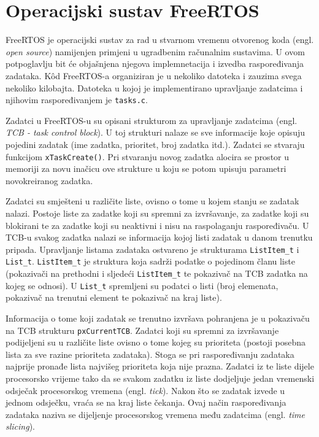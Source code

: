 \documentclass[../zavrsni.tex]{subfiles}
\begin{document}
\sloppy

\justifying

\section{Operacijski sustav FreeRTOS}

FreeRTOS je operacijski sustav za rad u stvarnom vremenu otvorenog koda (engl. \textit{open source}) namijenjen primjeni u ugradbenim 
računalnim sustavima. U ovom potpoglavlju bit će objašnjena 
njegova implemnetacija i izvedba raspoređivanja zadataka. K\^{o}d FreeRTOS-a organiziran je u nekoliko datoteka i zauzima 
svega nekoliko kilobajta. Datoteka u kojoj je implementirano upravljanje zadatcima i njihovim raspoređivanjem je \texttt{tasks.c}.

Zadatci u FreeRTOS-u su opisani strukturom za upravljanje zadatcima (engl. \textit{TCB - task control block}). U toj strukturi nalaze
se sve informacije koje opisuju pojedini zadatak (ime zadatka, prioritet, broj zadatka itd.).  
Zadatci se stvaraju funkcijom \texttt{xTaskCreate()}.
Pri stvaranju novog zadatka alocira se prostor u memoriji za novu inačicu 
ove strukture u koju se potom upisuju parametri novokreiranog zadatka.

Zadatci su smješteni u različite liste, ovisno o tome u kojem stanju se zadatak nalazi. Postoje liste za zadatke koji su
spremni za izvršavanje, za zadatke koji su blokirani te za zadatke koji su neaktivni i nisu na raspolaganju raspoređivaču.
U TCB-u svakog zadatka nalazi se informacija kojoj listi zadatak u danom trenutku pripada. Upravljanje listama zadataka ostvareno je strukturama
\texttt{ListItem\_t} i \texttt{List\_t}. \texttt{ListItem\_t} je struktura koja sadrži podatke o pojedinom članu liste (pokazivači na prethodni i 
sljedeći \texttt{ListItem\_t} te 
pokazivač na TCB zadatka na kojeg se odnosi). U \texttt{List\_t} spremljeni su podatci o listi (broj elemenata, pokazivač na trenutni element te
pokazivač na kraj liste).

Informacija o tome koji zadatak se trenutno izvršava pohranjena je u pokazivaču na TCB strukturu \texttt{pxCurrentTCB}.
Zadatci koji su spremni za izvršavanje podijeljeni su u različite liste ovisno o tome kojeg su prioriteta (postoji posebna lista
 za sve razine prioriteta zadataka).
Stoga se pri raspoređivanju zadataka najprije pronađe lista najvišeg prioriteta koja nije prazna. Zadatci iz te liste dijele 
procesorsko vrijeme tako da se svakom zadatku iz liste dodjeljuje jedan vremenski odsječak procesorskog vremena (engl. \textit{tick}).
Nakon što se zadatak izvede u jednom odsječku, vraća se na kraj liste čekanja. Ovaj način raspoređivanja zadataka naziva se dijeljenje
procesorskog vremena među zadatcima (engl. \textit{time slicing}).
\end{document}
